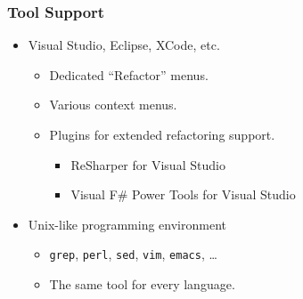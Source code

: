 \begin{frame}

\frametitle{Tool Support}

\begin{itemize}

\item Visual Studio, Eclipse, XCode, etc.

\begin{itemize}

\item Dedicated ``Refactor'' menus.

\item Various context menus.

\item Plugins for extended refactoring support.

\begin{itemize}

\item ReSharper for Visual Studio

\item Visual F\# Power Tools for Visual Studio

\end{itemize}

\end{itemize}

\item Unix-like programming environment

\begin{itemize}

\item \texttt{grep}, \texttt{perl}, \texttt{sed}, \texttt{vim}, \texttt{emacs}, \ldots

\item The same tool for every language.

\end{itemize}

\end{itemize}

\end{frame}

